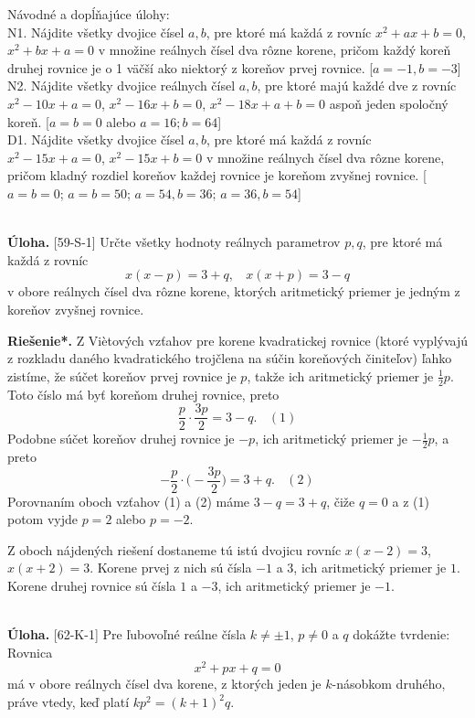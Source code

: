 \documentclass[11pt,a4paper,oneside,final]{book}
\newcommand{\ul}{\textbf{Úloha.} }
\newcommand{\rieh}{\textbf{Riešenie*.} }
\begin{document}
Návodné a dopĺňajúce úlohy:\\
N1. Nájdite všetky dvojice čísel $a, b$, pre ktoré má každá z rovníc $x^2 + ax + b = 0$, $x^2 + bx + a = 0$ v množine reálnych čísel dva rôzne korene, pričom každý koreň druhej rovnice je o 1 väčší ako niektorý z koreňov prvej rovnice. [$a =-1, b =-3$]\\
N2. Nájdite všetky dvojice reálnych čísel $a, b$, pre ktoré majú každé dve z rovníc $x^2-10x+ a = 0$, $x^2-16x + b = 0$, $x^2-18x + a + b = 0$ aspoň jeden spoločný koreň. [$a = b = 0$ alebo $a = 16; b = 64$]\\
D1. Nájdite všetky dvojice čísel $a, b$, pre ktoré má každá z rovníc $x^2-15x + a = 0$, $x^2-15x+b = 0$ v množine reálnych čísel dva rôzne korene, pričom kladný rozdiel koreňov každej rovnice je koreňom zvyšnej rovnice. [$a = b = 0$; $a = b = 50$; $a = 54, b = 36$; $a = 36, b = 54$]\\
\\
\begin{tcolorbox}[breakable,notitle,boxrule=0pt,colback=light-gray,colframe=light-gray]\ul[59-S-1] Určte všetky hodnoty reálnych parametrov $p, q$, pre ktoré má každá z rovníc
$$x(x - p) = 3 + q, \ \ \ \ x(x + p) = 3 - q$$
v obore reálnych čísel dva rôzne korene, ktorých aritmetický priemer je jedným z koreňov
zvyšnej rovnice.

\end{tcolorbox}

\rieh Z Viètových vzťahov pre korene kvadratickej rovnice (ktoré vyplývajú z rozkladu daného kvadratického trojčlena na súčin koreňových činiteľov) ľahko zistíme, že súčet koreňov prvej rovnice je $p$, takže ich aritmetický priemer je $\frac{1}{2}p$. Toto číslo má byť
koreňom druhej rovnice, preto
$$\frac{p}{2}\cdot \frac{3p}{2}= 3 - q. \ \ \ \ (1)$$
Podobne súčet koreňov druhej rovnice je $-p$, ich aritmetický priemer je $-\frac{1}{2}p$, a preto
$$-\frac{p}{2}\cdot \bigg(- \frac{3p}{2}\bigg)= 3 + q. \ \ \ \ (2)$$
Porovnaním oboch vzťahov (1) a (2) máme $3 - q = 3 + q$, čiže $q = 0$ a z (1) potom vyjde $p = 2$ alebo $p = -2$.

Z oboch nájdených riešení dostaneme tú istú dvojicu rovníc $x(x - 2) = 3$, $x(x + 2) = 3$. Korene prvej z nich sú čísla $-1$ a $3$, ich aritmetický priemer je $1$. Korene druhej rovnice sú čísla $1$ a $-3$, ich aritmetický priemer je $-1$.\\
\\
\begin{tcolorbox}[breakable,notitle,boxrule=0pt,colback=light-gray,colframe=light-gray]\ul [62-K-1] Pre ľubovoľné reálne čísla $k\neq \pm 1$, $p \neq 0$ a $q$ dokážte tvrdenie: Rovnica
$$x^2+ px + q = 0$$
má v obore reálnych čísel dva korene, z ktorých jeden je $k$-násobkom druhého, práve vtedy, keď platí $kp^2 = (k + 1)^2 q$.

\end{tcolorbox}
\end{document}
